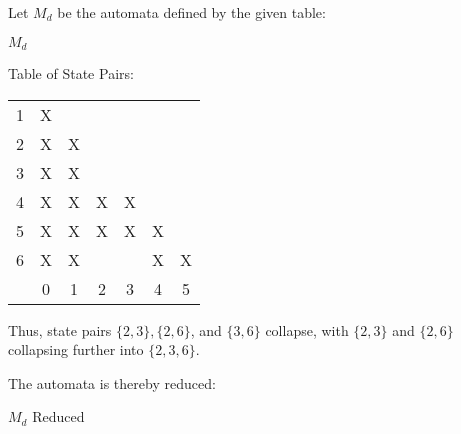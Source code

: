 Let $M_d$ be the automata defined by the given table:
\begin{automata}{$M_d$}
	
	
	
	
	
	
	
	
	
\end{automata}

Table of State Pairs: \\
\begin{center} \begin{tabular}{*{7}{c|}}
									\cline{1-2}
	1 & X                     \\	\cline{1-3}
	2 & X & X                 \\	\cline{1-4}
	3 & X & X &               \\	\cline{1-5}
	4 & X & X & X & X         \\	\cline{1-6}
	5 & X & X & X & X & X     \\	\hline
	6 & X & X &   &   & X & X \\	\hline
	  & 0 & 1 & 2 & 3 & 4 & 5 \\
\end{tabular} \end{center}

Thus, state pairs $\{2,3\}, \{2,6\}$, and $\{3,6\}$ collapse, with $\{2,3\}$ and $\{2,6\}$ collapsing further into $\{2,3,6\}$.

The automata is thereby reduced:
\begin{automata}{$M_d$ Reduced}
	
	
	
	
	
	
\end{automata}